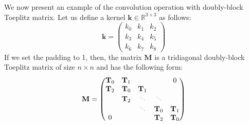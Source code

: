 We now present an example of the convolution operation with doubly-block Toeplitz matrix.
Let us define a kernel $\mathbf{k} \in \mathbb{R}^{3\times3}$ as follows:
\begin{equation}
    \mathbf{k} = \begin{pmatrix}
        k_{0} & k_{1} & k_{2} \\
        k_{3} & k_{4} & k_{5} \\
        k_{6} & k_{7} & k_{8} 
    \end{pmatrix}
\end{equation}
If we set the padding to 1, then, the matrix $\mathbf{M}$ is a tridiagonal doubly-block Toeplitz matrix of size $n \times n$ and has the following form:
\begin{equation}
    \mathbf{M} = \begin{pmatrix}
    \mathbf{T}_0 & \mathbf{T}_{1} &  &  & 0  \\
    \mathbf{T}_{2} & \mathbf{T}_0 & \mathbf{T}_{1} &  &  \\
     & \mathbf{T}_{2} & \scalebox{.70}{$\ddots$} & \scalebox{.70}{$\ddots$} &   \\
     &  & \scalebox{.70}{$\ddots$} & \mathbf{T}_0 & \mathbf{T}_{1}  \\
    0 &  &  & \mathbf{T}_{2} & \mathbf{T}_0  \\
    \end{pmatrix}
    \label{appendix-eq:operator_matrix}
\end{equation}

